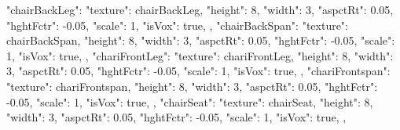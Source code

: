 {  "chairBackLeg": {
    "texture": chairBackLeg,
    "height": 8,
    "width": 3,
    "aspctRt": 0.05,
    "hghtFctr": -0.05,
    "scale": 1,
    "isVox": true,
  },
  "chairBackSpan": {
    "texture": chairBackSpan,
    "height": 8,
    "width": 3,
    "aspctRt": 0.05,
    "hghtFctr": -0.05,
    "scale": 1,
    "isVox": true,
  },
  "chariFrontLeg": {
    "texture": chariFrontLeg,
    "height": 8,
    "width": 3,
    "aspctRt": 0.05,
    "hghtFctr": -0.05,
    "scale": 1,
    "isVox": true,
  },
  "chariFrontspan": {
    "texture": chariFrontspan,
    "height": 8,
    "width": 3,
    "aspctRt": 0.05,
    "hghtFctr": -0.05,
    "scale": 1,
    "isVox": true,
  },
  "chairSeat": {
    "texture": chairSeat,
    "height": 8,
    "width": 3,
    "aspctRt": 0.05,
    "hghtFctr": -0.05,
    "scale": 1,
    "isVox": true,
  },







}
